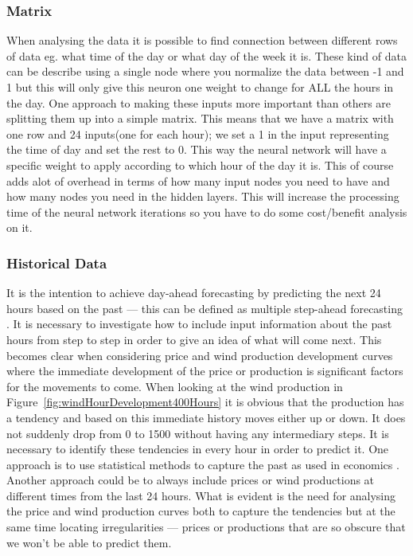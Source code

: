 \subsubsection{Matrix}
When analysing the data it is possible to find connection between different rows of data eg. what time of the day or what day of the week it is. These kind of data can be describe using a single node where you normalize the data between -1 and 1 but this will only give this neuron one weight to change for ALL the hours in the day. One approach to making these inputs more important than others are splitting them up into a simple matrix. This means that we have a matrix with one row and 24 inputs(one for each hour); we set a 1 in the input representing the time of day and set the rest to 0. This way the neural network will have a specific weight to apply according to which hour of the day it is. This of course adds alot of overhead in terms of how many input nodes you need to have and how many nodes you need in the hidden layers. This will increase the processing time of the neural network iterations so you have to do some cost/benefit analysis on it. 

\subsubsection{Historical Data}
It is the intention to achieve day-ahead forecasting by predicting the next 24 hours based on the past --- this can be defined as multiple step-ahead forecasting . It is necessary to investigate how to include input information about the past hours from step to step in order to give an idea of what will come next. This becomes clear when considering price and wind production development curves where the immediate development of the price or production is significant factors for the movements to come. When looking at the wind production in Figure~\ref{fig:windHourDevelopment400Hours} it is obvious that the production has a tendency and based on this immediate history moves either up or down. It does not suddenly drop from 0 to 1500 without having any intermediary steps. It is necessary to identify these tendencies in every hour in order to predict it. One approach is to use statistical methods to capture the past as used in economics . Another approach could be to always include prices or wind productions at different times from the last 24 hours. What is evident is the need for analysing the price and wind production curves both to capture the tendencies but at the same time locating irregularities --- prices or productions that are so obscure that we won't be able to predict them.

